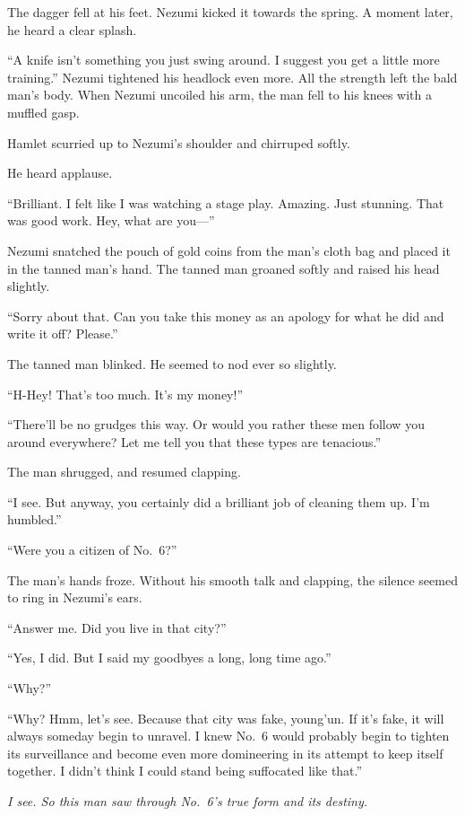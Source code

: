 The dagger fell at his feet. Nezumi kicked it towards the spring. A
moment later, he heard a clear splash.

``A knife isn't something you just swing around. I suggest you get a
little more training.'' Nezumi tightened his headlock even more. All the
strength left the bald man's body. When Nezumi uncoiled his arm, the man
fell to his knees with a muffled gasp.

Hamlet scurried up to Nezumi's shoulder and chirruped softly.

He heard applause.

``Brilliant. I felt like I was watching a stage play. Amazing. Just
stunning. That was good work. Hey, what are you---''

Nezumi snatched the pouch of gold coins from the man's cloth bag and
placed it in the tanned man's hand. The tanned man groaned softly and
raised his head slightly.

``Sorry about that. Can you take this money as an apology for what he
did and write it off? Please.''

The tanned man blinked. He seemed to nod ever so slightly.

``H-Hey! That's too much. It's my money!''

``There'll be no grudges this way. Or would you rather these men follow
you around everywhere? Let me tell you that these types are tenacious.''

The man shrugged, and resumed clapping.

``I see. But anyway, you certainly did a brilliant job of cleaning them
up. I'm humbled.''

``Were you a citizen of No.~6?''

The man's hands froze. Without his smooth talk and clapping, the silence
seemed to ring in Nezumi's ears.

``Answer me. Did you live in that city?''

``\el Yes, I did. But I said my goodbyes a long, long time ago.''

``Why?''

``Why? Hmm, let's see. Because that city was fake, young'un. If it's
fake, it will always someday begin to unravel. I knew No.~6 would
probably begin to tighten its surveillance and become even more
domineering in its attempt to keep itself together. I didn't think I
could stand being suffocated like that.''

\emph{I see. So this man saw through No.~6's true form and its destiny.}

